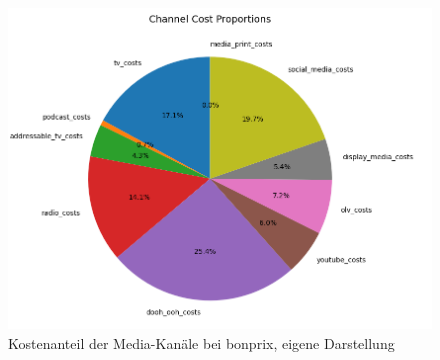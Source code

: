 \begin{figure}
    \centering
    \includegraphics[width=0.8\linewidth]{images/mediapie.png}
    \caption{Kostenanteil der Media-Kanäle bei bonprix, eigene Darstellung}
    \label{fig:enter-label}
\end{figure}

